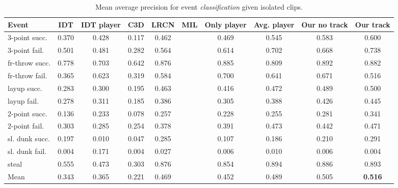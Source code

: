 \begin{table}[t!]
\begin{center}
\small
 \begin{tabular}{|l|c|c|c|c|c|c|c|c|c|}
  \hline
Event & IDT\cite{Wang_CVPR11} & IDT\cite{Wang_CVPR11} player & C3D \cite{Tran_arxiv14} & LRCN \cite{Donahue_arxiv14} & MIL\cite{} & Only player & Avg. player & Our no track & Our track \\ \hline \hline

3-point succ.    & 0.370 & 0.428 & 0.117 & 0.462 &  & 0.469 & 0.545 & 0.583 & 0.600 \\
3-point fail.    & 0.501 &  0.481& 0.282 & 0.564 &  & 0.614 & 0.702 & 0.668 & 0.738 \\
fr-throw succ. & 0.778 &  0.703& 0.642 & 0.876 &  & 0.885 & 0.809 & 0.892 & 0.882 \\
fr-throw fail. & 0.365 &  0.623& 0.319 & 0.584 &  & 0.700 & 0.641 & 0.671 & 0.516 \\
layup succ.      & 0.283 & 0.300 & 0.195 & 0.463 &  & 0.416 & 0.472 & 0.489 & 0.500 \\
layup fail.      & 0.278 &0.311  & 0.185 & 0.386 &  & 0.305 & 0.388 & 0.426 & 0.445 \\
2-point succ.    & 0.136 &  0.233 & 0.078 & 0.257 &  & 0.228 & 0.255 & 0.281 & 0.341 \\
2-point fail.    & 0.303 &  0.285 & 0.254 & 0.378 &  & 0.391 & 0.473 & 0.442 & 0.471 \\
sl. dunk succ.  & 0.197 &  0.010 & 0.047 & 0.285 &  & 0.107 & 0.186 & 0.210 & 0.291 \\
sl. dunk fail.  & 0.004 &  0.171& 0.004 & 0.027 &  & 0.006 & 0.010 & 0.006 & 0.004 \\
steal            & 0.555 &  0.473& 0.303 & 0.876 &  & 0.854 & 0.894 & 0.886 & 0.893 \\ \hline \hline
Mean             & 0.343 &  0.365 & 0.221 & 0.469 &  & 0.452 & 0.489 & 0.505 & \textbf{0.516} \\ \hline
  \end{tabular}
\end{center}
  \caption{Mean average precision for event {\em classification} given
    isolated clips.}
  \label{tab:event_class}
  \label{tab:class_res}
\end{table}

